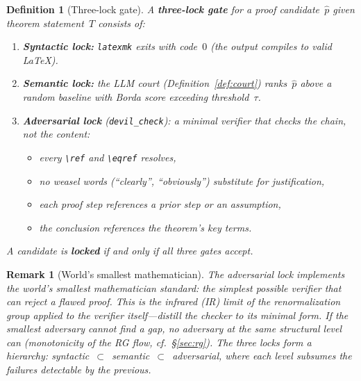 \documentclass[11pt,a4paper]{article}
\newtheorem{definition}[theorem]{Definition}
\newtheorem{remark}[theorem]{Remark}
\begin{document}
\begin{definition}[Three-lock gate]\label{def:three-lock}
A \textbf{three-lock gate} for a proof candidate~$\hat{p}$ given
theorem statement~$T$ consists of:
\begin{enumerate}[label=(\roman*),nosep]
\item \textbf{Syntactic lock:} \texttt{latexmk} exits with code~$0$
  (the output compiles to valid \LaTeX).
\item \textbf{Semantic lock:} the LLM court
  (Definition~\ref{def:court}) ranks~$\hat{p}$ above a random
  baseline with Borda score exceeding threshold~$\tau$.
\item \textbf{Adversarial lock} (\texttt{devil\_check}): a minimal
  verifier that checks the \emph{chain}, not the content:
  \begin{itemize}[nosep]
  \item every \verb|\ref| and \verb|\eqref| resolves,
  \item no weasel words (``clearly'', ``obviously'') substitute
    for justification,
  \item each proof step references a prior step or an assumption,
  \item the conclusion references the theorem's key terms.
  \end{itemize}
\end{enumerate}
A candidate is \textbf{locked} if and only if all three gates accept.
\end{definition}

\begin{remark}[World's smallest mathematician]\label{rem:smallest-math}
The adversarial lock implements the \emph{world's smallest mathematician}
standard: the simplest possible verifier that can reject a flawed proof.
This is the infrared (IR) limit of the renormalization group applied to
the verifier itself---distill the checker to its minimal form.
If the smallest adversary cannot find a gap, no adversary
at the same structural level can (monotonicity of the RG flow,
cf.~\S\ref{sec:rg}).
The three locks form a hierarchy:
syntactic~$\subset$~semantic~$\subset$~adversarial,
where each level subsumes the failures detectable by the previous.
\end{remark}
\end{document}
